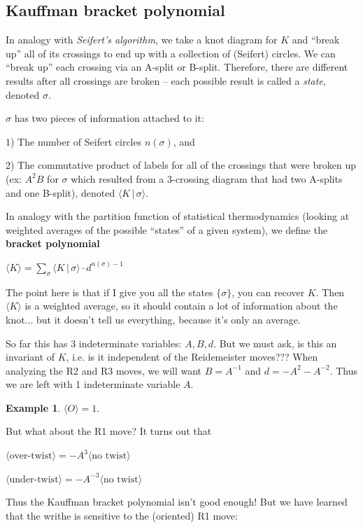 \documentclass[11pt]{article}
\theoremstyle{plain}
\theoremstyle{definition}
\newtheorem{ex}{Example}
\begin{document}
\subsection{Kauffman bracket polynomial}
In analogy with \textit{Seifert's algorithm}, we take a knot diagram for $K$ and ``break up'' all of its crossings to end up with a collection of (Seifert) circles. We can ``break up'' each crossing via an A-split or B-split. Therefore, there are different results after all crossings are broken -- each possible result is called a \textit{state}, denoted $\sigma$.

$\sigma$ has two pieces of information attached to it:

1) The number of Seifert circles $n(\sigma)$, and

2) The commutative product of labels for all of the crossings that were broken up (ex: $A^2B$ for $\sigma$ which resulted from a 3-crossing diagram that had two A-splits and one B-split), denoted $\langle K\,|\,\sigma\rangle$.

\bigskip
In analogy with the partition function of statistical thermodynamics (looking at weighted averages of the possible ``states'' of a given system), we define the \textbf{bracket polynomial}
\begin{center}
$\langle K\rangle =\sum_\sigma\langle K\,|\,\sigma\rangle\cdot d^{n(\sigma)-1}$
\end{center}
The point here is that if I give you all the states $\lbrace\sigma\rbrace$, you can recover $K$. Then $\langle K\rangle$ is a weighted average, so it should contain a lot of information about the knot... but it doesn't tell us everything, because it's only an average.

So far this has 3 indeterminate variables: $A,B,d$. But we must ask, is this an invariant of $K$, i.e. is it independent of the Reidemeister moves??? When analyzing the R2 and R3 moves, we will want $B=A^{-1}$ and $d=-A^2-A^{-2}$. Thus we are left with 1 indeterminate variable $A$.

\begin{ex}
$\langle O\rangle=1$.
\end{ex}
\noindent
But what about the R1 move? It turns out that

$\langle\text{over-twist}\rangle=-A^3\langle\text{no twist}\rangle$

$\langle\text{under-twist}\rangle=-A^{-3}\langle\text{no twist}\rangle$

\noindent
Thus the Kauffman bracket polynomial isn't good enough! But we have learned that the writhe is sensitive to the (oriented) R1 move:
\end{document}
